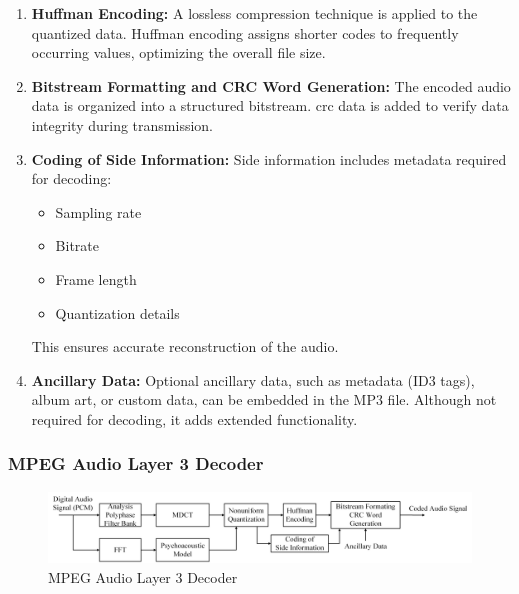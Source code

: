 \documentclass{ioereport}
\begin{document}
\begin{enumerate}[label=\textbf{\roman*.}]
            \item \textbf{Huffman Encoding:}  
            A lossless compression technique is applied to the quantized data. Huffman encoding assigns shorter codes to frequently occurring values, optimizing the overall file size.
        
            \item \textbf{Bitstream Formatting and CRC Word Generation:}  
            The encoded audio data is organized into a structured bitstream. \gls{crc} data is added to verify data integrity during transmission.
        
            \item \textbf{Coding of Side Information:}  
            Side information includes metadata required for decoding:
            \begin{itemize}
                \item Sampling rate
                \item Bitrate
                \item Frame length
                \item Quantization details
            \end{itemize}
            This ensures accurate reconstruction of the audio.
        
            \item \textbf{Ancillary Data:}  
            Optional ancillary data, such as metadata (ID3 tags), album art, or custom data, can be embedded in the MP3 file. Although not required for decoding, it adds extended functionality.
        \end{enumerate}

        \subsubsection{MPEG Audio Layer 3 Decoder}

        \begin{figure}[H]
            \centering
            \includegraphics[width=0.95\linewidth]{assets/mp3_encoder.png}
            \caption{MPEG Audio Layer 3 Decoder}
            \label{fig:mp3_decoder}
        \end{figure}
        
\end{document}
